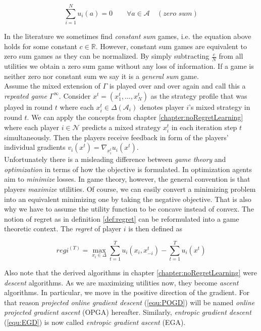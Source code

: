 \begin{equation*}
    \sum_{i = 1}^{N} u_i(a)= 0 \qquad \forall a \in \mathcal{A} \quad (\textit{zero sum})
\end{equation*}

In the literature we sometimes find \textit{constant sum} games, i.e. the equation above holds for some constant $c \in \mathbb{R}$. However, constant sum games are equivalent to zero sum games as they can be normalized. By simply subtracting $\frac{c}{N}$ from all utilities we obtain a zero sum game without any loss of information. If a game is neither zero nor constant sum we say it is a \textit{general sum} game.\\

Assume the mixed extension of $\Gamma$ is played over and over again and call this a \textit{repeated game} $\Gamma^{\infty}$. Consider $x^t = (x_{1}^{t},\dots,x_{N}^{t})$ as the strategy profile that was played in round $t$ where each $x_{i}^{t} \in \Delta(\mathcal{A}_i)$ denotes player $i$'s mixed strategy in round $t$. We can apply the concepts from chapter \ref{chapter:noRegretLearning} where each player $i \in \mathcal{N}$ predicts a mixed strategy $x_{i}^{t}$ in each iteration step $t$ simultaneously. Then the players receive feedback in form of the players' individual gradients $v_{i}(x^t) = \nabla_{x_{i}^{t}}u_{i}(x^t)$. \\

Unfortunately there is a misleading difference between \textit{game theory} and \textit{optimization} in terms of how the objective is formulated. In optimization agents aim to \textit{minimize} losses. In game theory, however, the general convention is that players \textit{maximize} utilities. Of course, we can easily convert a minimizing problem into an equivalent minimizing one by taking the negative objective. That is also why we have to assume the utility function to be concave instead of convex. The notion of regret as in definition \ref{def:regret} can be reformulated into a game theoretic context. The \textit{regret} of player $i$ is then defined as

\begin{equation*}
    reg{i}^(T) = \max_{x_i \in \Delta}\sum_{t=1}^{T} u_i(x_i,x_{-i}^{t}) - \sum_{t=1}^{T}u_i(x^t)
\end{equation*}

Also note that the derived algorithms in chapter \ref{chapter:noRegretLearning} were \textit{descent} algorithms. As we are maximizing utilities now, they become \textit{ascent} algorithms. In particular, we move in the positive direction of the gradient. For that reason \textit{projected online gradient descent} (\ref{equ:POGD}) will be named \textit{online projected gradient ascent} (OPGA) hereafter. Similarly, \textit{entropic gradient descent} (\ref{equ:EGD}) is now called \textit{entropic gradient ascent} (EGA). \\

